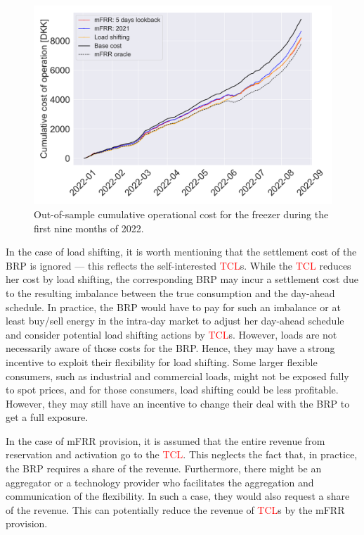 \documentclass[11pt,a4paper]{article}
\begin{document}
\begin{figure}[t]
    \centering
    \includegraphics[width=\columnwidth]{figures/cumulative_cost_comparison.png}
    \caption{Out-of-sample cumulative operational cost for the freezer during the first nine months of 2022.}
    \label{fig:cumulative_cost_comparison}
\end{figure}

In the case of load shifting, it is worth mentioning that the settlement cost of the BRP is ignored --- this reflects the self-interested \textcolor{red}{TCL}s.  While the \textcolor{red}{TCL} reduces her cost by load shifting, the corresponding BRP may incur a settlement cost due to the resulting imbalance between the true consumption and the day-ahead schedule. In practice, the BRP would have to pay for such an imbalance or at least buy/sell energy in the intra-day market to adjust her day-ahead schedule and consider potential load shifting actions by \textcolor{red}{TCL}s. However, loads are not necessarily aware of those costs for the BRP. Hence, they may have a strong incentive to exploit their flexibility for load shifting. Some larger flexible consumers, such as industrial and commercial loads, might not be exposed fully to spot prices, and for those consumers, load shifting could be less profitable. However, they may still have an incentive to change their deal with the BRP to get a full exposure.

In the case of mFRR  provision, it is   assumed that the entire revenue from reservation and activation go to the \textcolor{red}{TCL}. This neglects the fact that, in practice, the BRP requires a share of the revenue. Furthermore, there might be an aggregator or a technology provider who facilitates the aggregation and communication of the flexibility. In such a case, they would also request a share of the revenue. This can potentially reduce the revenue of \textcolor{red}{TCL}s by the mFRR provision.
\end{document}
